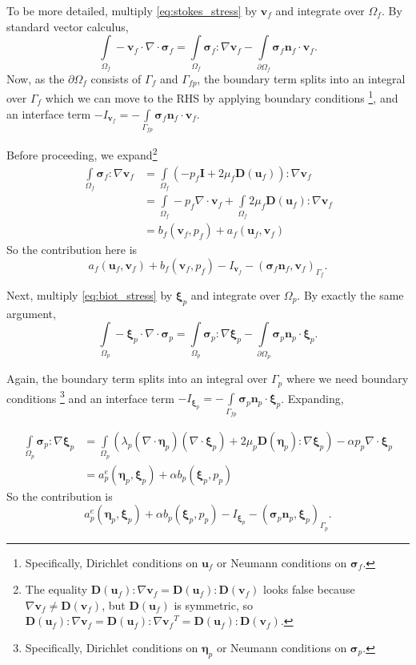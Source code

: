 \documentclass{article}
\newcommand{\mathspace}[1]{\ensuremath{#1}\xspace} %
\newcommand{\D}{\mathspace{\mathbf{D}}}
\newcommand{\sigmabf}{\mathspace{\boldsymbol{\sigma}}}
\newcommand{\grad}{\mathspace{\nabla}}
\renewcommand{\div}{\mathspace{\nabla \cdot}}
\newcommand{\stokes}{\mathspace{\Omega_{f}}}
\newcommand{\stokesbdy}{\mathspace{\Gamma_{f}}}
\newcommand{\darcy}{\mathspace{\Omega_{p}}}
\newcommand{\darcybdy}{\mathspace{\Gamma_{p}}}
\newcommand{\interface}{\mathspace{\Gamma_{fp}}}
\newcommand{\nf}{\mathspace{\mathbf{n}_f}}
\newcommand{\np}{\mathspace{\mathbf{n}_p}}
\newcommand{\intD}{\mathspace{\int \limits_{\darcy}}}
\newcommand{\intDbdyI}{\mathspace{\int \limits_{\partial \darcy}}}
\newcommand{\intS}{\mathspace{\int \limits_{\stokes}}}
\newcommand{\intSbdyI}{\mathspace{\int \limits_{\partial \stokes}}}
\newcommand{\intI}{\mathspace{\int \limits_{\interface}}}
\newcommand{\uf}{\mathspace{\mathbf{u}_f}}
\newcommand{\vf}{\mathspace{\mathbf{v}_f}}
\newcommand{\pf}{\mathspace{p_f}}
\newcommand{\pp}{\mathspace{p_p}}
\newcommand{\wf}{\mathspace{w_f}}
\newcommand{\disp}{\mathspace{\boldsymbol{\eta}_p}}
\newcommand{\disptest}{\mathspace{\boldsymbol{\xi}_p}}
\begin{document}
To be more detailed, multiply \eqref{eq:stokes_stress} by \vf and integrate over \stokes. By standard vector calculus,
$$\intS - \vf \cdot \div \sigmabf_f = \intS \sigmabf_f \colon \grad \vf - \intSbdyI \sigmabf_f\nf  \cdot \vf.$$
Now, as the $\partial \stokes$ consists of \stokesbdy and \interface, the boundary term splits into an integral over \stokesbdy which we can move to the RHS by applying boundary conditions \footnote{Specifically, Dirichlet conditions on \uf or Neumann conditions on $\sigmabf_f$.}, and an interface term $-I_{\vf} = -\intI \sigmabf_f \nf \cdot \vf$.

Before proceeding, we expand\footnote{The equality $\D(\uf) \colon \grad \vf = \D(\uf) \colon \D(\vf)$ looks false because $\grad \vf \neq \D(\vf)$, but $\D(\uf)$ is symmetric, so $\D(\uf) \colon \grad \vf = \D(\uf) \colon \grad \vf^T = \D(\uf) \colon \D(\vf)$.}
\begin{align*}
  \intS \sigmabf_f \colon \grad \vf &= \intS (-\pf \mathbf{I} + 2 \mu_f \D(\uf)) \colon \grad \vf \\
                                    &= \intS -\pf \div \vf + \intS 2 \mu_f \D(\uf) \colon \grad \vf \\
                                      &= b_f(\vf, \pf) + a_f(\uf, \vf)
\end{align*}
So the contribution here is $$a_f(\uf, \vf) + b_f(\vf, \pf) -I_{\vf} - (\sigmabf_f\nf, \vf)_{\stokesbdy}.$$



Next, multiply \eqref{eq:biot_stress} by \disptest and integrate over \darcy. By exactly the same argument,
$$\intD - \disptest \cdot \div \sigmabf_p = \intD \sigmabf_p \colon \grad \disptest - \intDbdyI \sigmabf_p\np  \cdot \disptest.$$

Again, the boundary term splits into an integral over \darcybdy where we need boundary conditions \footnote{Specifically, Dirichlet conditions on \disp or Neumann conditions on $\sigmabf_p$.} and an interface term $-I_{\disptest} = -\intI \sigmabf_p \np \cdot \disptest$. Expanding,

\begin{align*}
  \intD \sigmabf_p \colon \grad \disptest &=  \intD  \left ( \lambda_p (\div \disp)(\div \disptest)  + 2 \mu_p \D(\disp) \colon \grad \disptest \right)
                                            - \alpha \pp \div \disptest \\
                                          &= a^e_p(\disp, \disptest) + \alpha b_p(\disptest, \pp)
\end{align*}
So the contribution is $$a^e_p(\disp, \disptest) + \alpha b_p(\disptest, \pp) - I_{\disptest} - (\sigmabf_p\np, \disptest)_{\darcybdy}.$$
\end{document}
